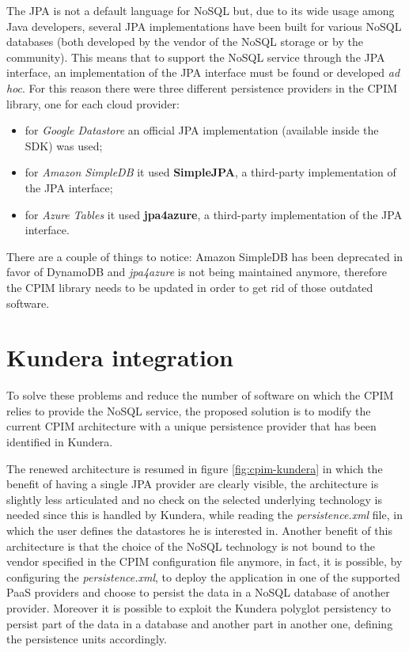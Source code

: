 \newparagraph The JPA is not a default language for NoSQL but, due to its wide usage among Java developers, several JPA implementations have been built for various NoSQL databases (both developed by the vendor of the NoSQL storage or by the community).
This means that to support the NoSQL service through the JPA interface, an implementation of the JPA interface must be found or developed \textit{ad hoc}. For this reason there were three different persistence providers in the CPIM library, one for each cloud provider:
\begin{itemize}
\item for \textit{Google Datastore} an official JPA implementation (available inside the SDK) was used;
\item for \textit{Amazon SimpleDB} it used \textbf{SimpleJPA}, a third-party implementation of the JPA interface;
\item for \textit{Azure Tables} it used \textbf{jpa4azure}, a third-party implementation of the JPA interface.
\end{itemize}

\noindent There are a couple of things to notice: Amazon SimpleDB has been deprecated in favor of DynamoDB and \textit{jpa4azure} is not being maintained anymore, therefore the CPIM library needs to be updated in order to get rid of those outdated software.

\section{Kundera integration}
\label{sec:kundera-integration}
To solve these problems and reduce the number of software on which the CPIM relies to provide the NoSQL service, the proposed solution is to modify the current CPIM architecture with a unique persistence provider that has been identified in Kundera.

\newparagraph The renewed architecture is resumed in figure \ref{fig:cpim-kundera} in which the benefit of having a single JPA provider are clearly visible, the architecture is slightly less articulated and no check on the selected underlying technology is needed since this is handled by Kundera, while reading the \textit{persistence.xml} file, in which the user defines the datastores he is interested in.
Another benefit of this architecture is that the choice of the NoSQL technology is not bound to the vendor specified in the CPIM configuration file anymore, in fact, it is possible, by configuring the \textit{persistence.xml}, to deploy the application in one of the supported PaaS providers and choose to persist the data in a NoSQL database of another provider. Moreover it is possible to exploit the Kundera polyglot persistency to persist part of the data in a database and another part in another one, defining the persistence units accordingly.

